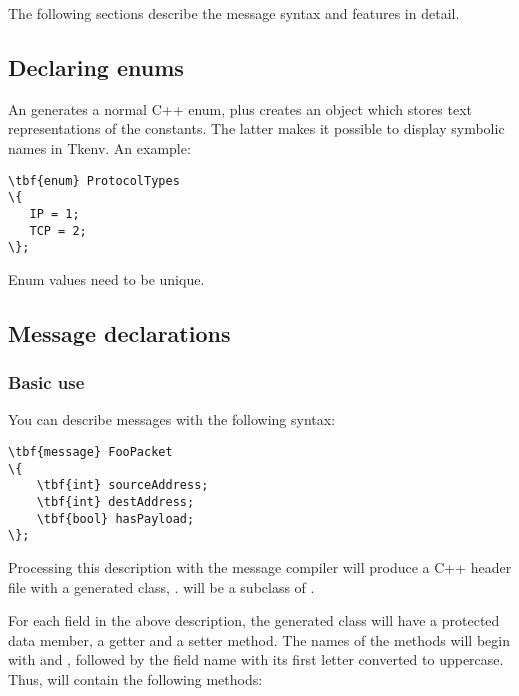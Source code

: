 The following sections describe the message syntax and features in detail.


\subsection{Declaring enums}

An  generates a normal C++ enum, plus creates an object
which stores text representations of the constants. The latter makes it possible
to display symbolic names in Tkenv.
An example:

\begin{Verbatim}[commandchars=\\\{\}]
\tbf{enum} ProtocolTypes
\{
   IP = 1;
   TCP = 2;
\};
\end{Verbatim}

Enum values need to be unique.


%

\subsection{Message declarations}

\subsubsection{Basic use}

You can describe messages with the following syntax:

\begin{Verbatim}[commandchars=\\\{\}]
\tbf{message} FooPacket
\{
    \tbf{int} sourceAddress;
    \tbf{int} destAddress;
    \tbf{bool} hasPayload;
\};
\end{Verbatim}

Processing this description with the message compiler will produce
a C++ header file with a generated class, .
 will be a subclass of .

For each field in the above description, the generated class will have
a protected data member, a getter and a setter method. The names of the
methods will begin with  and ,
followed by the field name with its first letter converted to uppercase.
Thus,  will contain the following methods:

